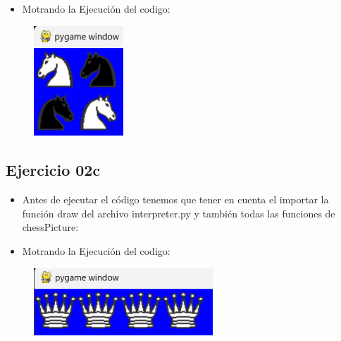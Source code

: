 \documentclass{article}
\begin{document}
		

	\begin{itemize}	
		\item Motrando la Ejecución del codigo:
	\end{itemize}	

	\begin{figure}[H]
		\centering
		\includegraphics[width=0.3\textwidth,keepaspectratio]{img/Ejercicio2b.png}
	\end{figure}

	\subsection{Ejercicio 02c}
	\begin{itemize}	
		\item Antes de ejecutar el código tenemos que tener en cuenta el importar la función draw del archivo interpreter.py y también todas las funciones de chessPicture:
	\end{itemize}	

		

	\begin{itemize}	
		\item Motrando la Ejecución del codigo:
	\end{itemize}	

	\begin{figure}[H]
		\centering
		\includegraphics[width=0.6\textwidth,keepaspectratio]{img/Ejercicio2c.png}
	\end{figure}
\end{document}
